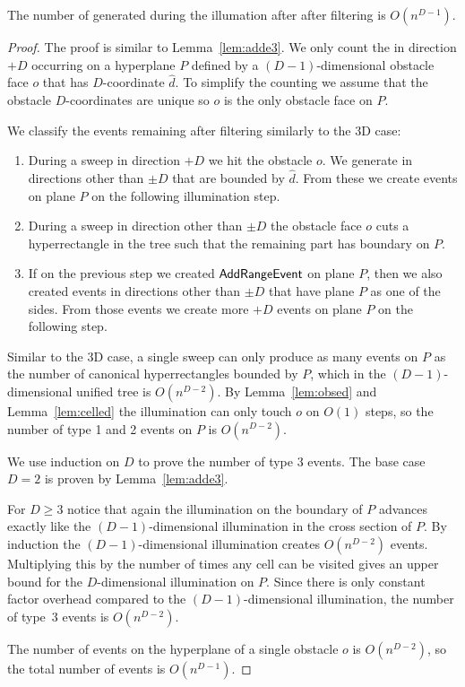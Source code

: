 \documentclass[english,gradu]{tktltiki2018}
\begin{document}
\begin{lem}\label{lem:added}The number of \addEs generated during the illumation after after filtering is $O(n^{D-1})$.\end{lem}
\begin{proof}
The proof is similar to Lemma~\ref{lem:adde3}.
We only count the \addEs in direction $+D$ occurring on a hyperplane $P$ defined by a $(D-1)$-dimensional obstacle face $o$ that has $D$-coordinate $\hat{d}$.
To simplify the counting we assume that the obstacle $D$-coordinates are unique so $o$ is the only obstacle face on $P$.

We classify the events remaining after filtering similarly to the 3D case:
\begin{enumerate}
\item During a sweep in direction $+D$ we hit the obstacle $o$.
	We generate \addEs in directions other than $\pm D$ that are bounded by $\hat{d}$.
	From these \addEs we create events on plane $P$ on the following illumination step.
\item During a sweep in direction other than $\pm D$ the obstacle face $o$ cuts a hyperrectangle in the tree such that the remaining part has boundary on $P$.
\item If on the previous step we created $\mathsf{AddRangeEvent}$ on plane $P$, then we also created events in directions other than $\pm D$ that have plane $P$ as one of the sides.
	From those events we create more $+D$ events on plane $P$ on the following step.
\end{enumerate}

Similar to the 3D case, a single sweep can only produce as many events on $P$ as the number of canonical hyperrectangles bounded by $P$, which in the $(D-1)$-dimensional unified tree is $O(n^{D-2})$.
By Lemma~\ref{lem:obsed} and Lemma~\ref{lem:celled} the illumination can only touch $o$ on $O(1)$ steps, so the number of type 1 and 2 events on $P$ is $O(n^{D-2})$.

We use induction on $D$ to prove the number of type 3 events.
The base case $D=2$ is proven by Lemma~\ref{lem:adde3}.

For $D\ge 3$ notice that again the illumination on the boundary of $P$ advances exactly like the $(D-1)$-dimensional illumination in the cross section of $P$.
By induction the $(D-1)$-dimensional illumination creates $O(n^{D-2})$ events.
Multiplying this by the number of times any cell can be visited gives an upper bound for the $D$-dimensional illumination on $P$.
Since there is only constant factor overhead compared to the $(D-1)$-dimensional illumination, the number of type~3 events is $O(n^{D-2})$.

The number of events on the hyperplane of a single obstacle $o$ is $O(n^{D-2})$, so the total number of events is $O(n^{D-1})$.
\end{proof}
\end{document}
